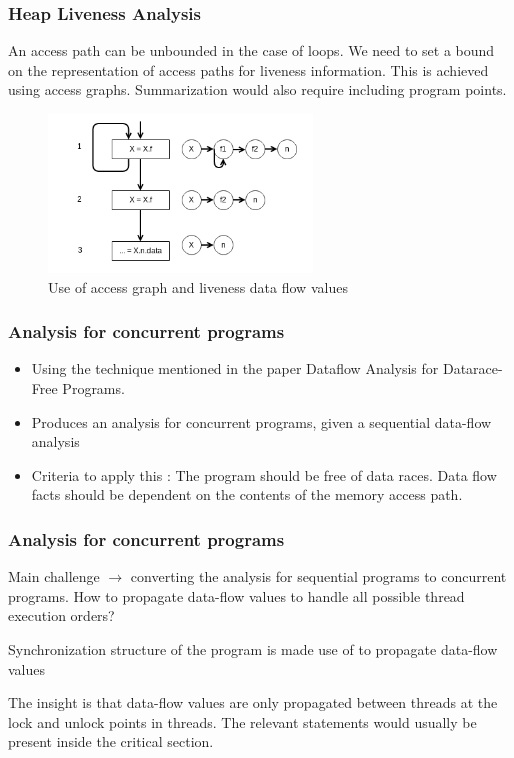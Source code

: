 \documentclass{beamer}
\begin{document}
\begin{frame}
\frametitle{Heap Liveness Analysis}

An access path can be unbounded in the case of loops. We need to set a bound on the representation of access paths for liveness information. This is achieved using access graphs. Summarization would also require including program points.

\begin{figure}[here]
	\begin{center}
		\includegraphics[width=7cm]{Figures/heap_summarization_liveness.png}
	\end{center}
	\caption{Use of access graph and liveness data flow values}
	\label{fig:accpath}
\end{figure}

\end{frame}



  
  
  \begin{frame}
  \frametitle{Analysis for concurrent programs}
  
  \begin{itemize}
  	\item Using the technique mentioned in the paper Dataflow Analysis for Datarace-Free Programs.
  	\item Produces an analysis for concurrent programs, given a sequential data-flow analysis
  	\item Criteria to apply this : The program should be free of data races. Data flow facts should be dependent on the contents of the memory access path.
  \end{itemize}
  
  \end{frame}
  
\begin{frame}
\frametitle{Analysis for concurrent programs}
Main challenge $\rightarrow$ converting the analysis for sequential programs to concurrent programs. How to propagate data-flow values to handle all possible thread execution orders?

\vspace{\baselineskip}
Synchronization structure of the program is made use of to propagate data-flow values

\vspace{\baselineskip}
The insight is that data-flow values are only propagated between threads at the lock and unlock points in threads. The relevant statements would usually be present inside the critical section.

\end{frame}  
  
\end{document}
